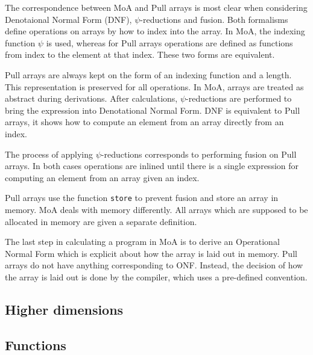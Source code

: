 \documentclass{sigplanconf}
\begin{document}
The correspondence between MoA and Pull arrays is most clear when
considering Denotaional Normal Form (DNF), \(\psi\)-reductions and
fusion. Both formalisms define operations on arrays by how to index
into the array. In MoA, the indexing function \(\psi\) is used,
whereas for Pull arrays operations are defined as functions from index
to the element at that index. These two forms are equivalent.

Pull arrays are always kept on the form of an indexing function and a
length. This representation is preserved for all operations. In MoA,
arrays are treated as abstract during derivations. After calculations,
\(\psi\)-reductions are performed to bring the expression into
Denotational Normal Form. DNF is equivalent to Pull arrays, it shows
how to compute an element from an array directly from an index.

The process of applying \(\psi\)-reductions corresponds to performing
fusion on Pull arrays. In both cases operations are inlined until
there is a single expression for computing an element from an array
given an index.

Pull arrays use the function \verb!store! to prevent fusion and store
an array in memory. MoA deals with memory differently. All arrays
which are supposed to be allocated in memory are given a separate
definition.

The last step in calculating a program in MoA is to derive an
Operational Normal Form which is explicit about how the array is laid
out in memory. Pull arrays do not have anything corresponding to
ONF. Instead, the decision of how the array is laid out is done by the
compiler, which uses a pre-defined convention.

\subsection{Higher dimensions}
\label{sec:highdim}

\subsection{Functions}
\label{sec:notation}
\end{document}
